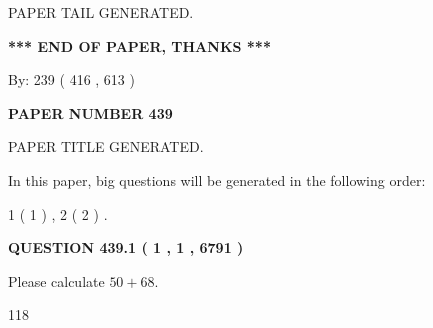 \documentclass[12pt]{article}
\begin{document}
   
   
\vspace{2.0in} PAPER TAIL GENERATED.
   
   
   
   
\vspace{1.0in} 
{\textbf{\large{ *** END OF PAPER, THANKS *** }}} 
   
   
\hspace{1.0in} By: 
 239 ( 416 ,  613 )
   
   
   
   
\newpage 
\setcounter{page}{ 
   439001 } 
   
   
   
   
 {\textbf{ \Large{ PAPER NUMBER  439  }}}
   
   
\vspace{0.2in}
   
   
   
   
   
   
   
   
 \vspace{0.2in}
 
 
 
 
   
   
 PAPER TITLE GENERATED.
   
   
   
\vspace{0.2in}
   
In this paper, big questions will be generated in the following order: 
   
   
   1 ( 1 )
 ,
   2 ( 2 )
 .
  
\vspace{0.2in}
  
{\textbf{\Large{QUESTION
439.1 
 ( 1 , 1 , 6791 )
}}}
  
  
 
Please calculate $ %
50 +  %
68 $.
 
 
 
\noindent{}
 
 

118
 
 
\noindent{}
 
 

 
 
 
\noindent{}
 
\end{document}
